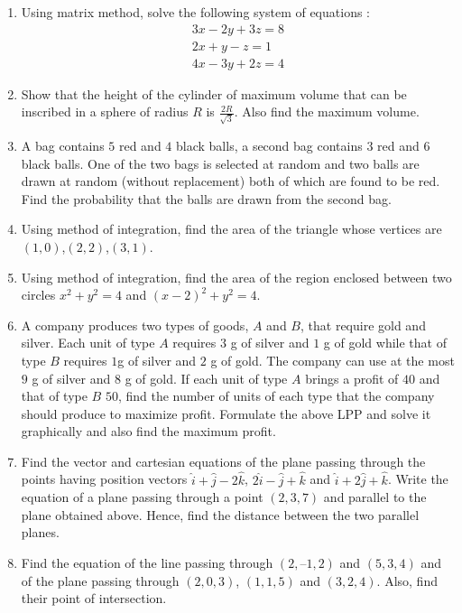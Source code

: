 \documentclass[12pt,-letter paper]{article}
\providecommand{\brak}[1]{\ensuremath{\left(#1\right)}}
\theoremstyle{remark}
\begin{document}
\begin{enumerate}
\item Using matrix method, solve the following system of equations :
\begin{align*}
    {3x-2y+3z}=8 \\
    {2x+y-z}=1 \\
    {4x-3y+2z}=4
\end{align*}

\item Show that the height of the cylinder of maximum volume that can be inscribed in a sphere of radius $R$ is $\frac{2R}{\sqrt{3}}$. Also find the maximum volume.

\item A bag contains $5$ red and $4$ black balls, a second bag contains $3$ red and $6$ black balls. One of the two bags is selected at random and two balls are drawn at random (without replacement) both of which are found to be red. Find the probability that the balls are drawn from the second bag.

\item Using method of integration, find the area of the triangle whose vertices are $\brak{1,0}$,$\brak{2,2}$,$\brak{3,1}$.

 \item Using method of integration, find the area of the region enclosed between two circles ${x^2+y^2=4}$ and $\brak{x-2}^2+{y^2}=4$.
 
 \item A company produces two types of goods, $A$ and $B$, that require gold and silver. Each unit of type $A$ requires $3$ g of silver and $1$ g of gold while that of type $B$ requires $1$g  of silver and $2$ g of gold. The company can use at the most $9$ g of silver and $8$ g of gold. If each unit of type $A$ brings a profit of \rupee $40$ and that of type $B$ \rupee $50$, find the number of units of each type that the company should produce to maximize profit. Formulate the above LPP and solve it graphically and also find the maximum profit.

 \item Find the vector and cartesian equations of the plane passing through the points having position vectors $\hat{i}+\hat{j}-2\hat{k}$, $2\hat{i}-\hat{j}+\hat{k}$ and $\hat{i}+2\hat{j}+\hat{k}$. Write the equation of a plane passing through a point \brak{2, 3, 7} and parallel to the plane obtained above. Hence, find the distance between the two parallel planes.
 
 \item Find the equation of the line passing through \brak{2, – 1, 2} and \brak{5, 3, 4} and of the plane passing through \brak{2, 0, 3}, \brak{1, 1, 5} and \brak{3, 2, 4}. Also, find
their point of intersection.


\end{enumerate}
    
\end{document}
